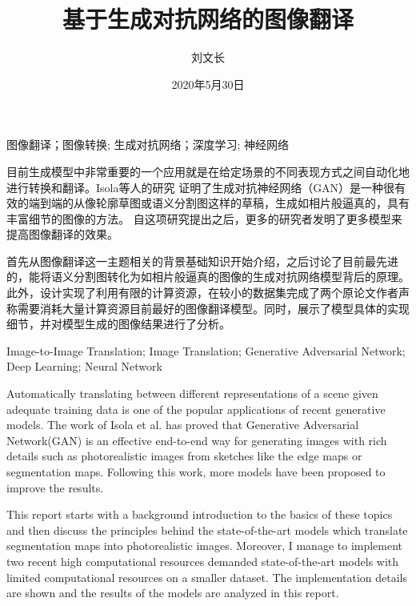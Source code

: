 \documentclass[supercite]{HustGraduPaper}
\title{基于生成对抗网络的图像翻译}
\author{刘文长}
\date{2020年5月30日}
\theoremstyle{definition}
\begin{document}
\maketitle

\statement

\clearpage


\begin{cnabstract}{图像翻译；图像转换; 生成对抗网络；深度学习; 神经网络}

目前生成模型中非常重要的一个应用就是在给定场景的不同表现方式之间自动化地进行转换和翻译。Isola等人的研究\cite{pix2pix2016}
证明了生成对抗神经网络（GAN）是一种很有效的端到端的从像轮廓草图或语义分割图这样的草稿，生成如相片般逼真的，具有丰富细节的图像的方法。
自这项研究提出之后，更多的研究者发明了更多模型来提高图像翻译的效果。

首先从图像翻译这一主题相关的背景基础知识开始介绍，之后讨论了目前最先进的，能将语义分割图转化为如相片般逼真的图像的生成对抗网络模型背后的原理。
此外，设计实现了利用有限的计算资源，在较小的数据集完成了两个原论文作者声称需要消耗大量计算资源目前最好的图像翻译模型。同时，展示了模型具体的实现
细节，并对模型生成的图像结果进行了分析。

\end{cnabstract}

\begin{enabstract}{Image-to-Image Translation; Image Translation; Generative Adversarial Network; Deep Learning; Neural Network}

Automatically translating between different representations of a scene given 
adequate training data 
is one of the popular applications of recent generative models. 
The work of Isola et al.\cite{pix2pix2016} has proved that 
Generative Adversarial Network(GAN) is an effective end-to-end way for generating images 
with rich details such as photorealistic images from sketches like the edge maps or segmentation maps. 
Following this work, more models have been proposed to improve the results. 

This report starts with a background introduction to the basics of these topics
and then discuss the principles behind the state-of-the-art models 
which translate segmentation maps into photorealistic images. 
Moreover, I manage to implement two recent high computational resources demanded 
state-of-the-art models with limited computational resources on a smaller dataset. 
The implementation details are shown and 
the results of the models are analyzed in this report.

\end{enabstract}
\end{document}
